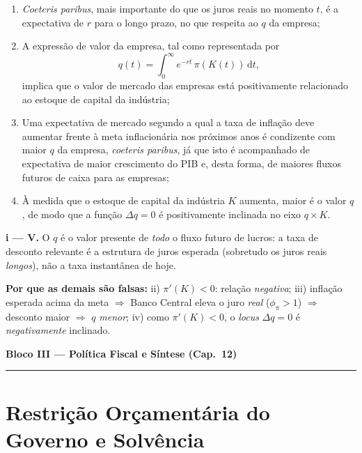 \documentclass[12pt, a4paper]{article}
\newcommand{\dif}{\mathrm{d}}
\begin{document}
\begin{enumerate}[label=\roman*)]
\item \emph{Coeteris paribus}, mais importante do que os juros reais no
momento $t$, é a expectativa de $r$ para o longo prazo, no que respeita ao $q$
da empresa;
\item A expressão de valor da empresa, tal como representada por
\[
q(t) = \int_{0}^{\infty} e^{-rt}\,\pi(K(t))\,\dif t,
\]
implica que o valor de mercado das empresas está positivamente relacionado ao
estoque de capital da indústria;
\item Uma expectativa de mercado segundo a qual a taxa de inflação deve
aumentar frente à meta inflacionária nos próximos anos é condizente com maior
$q$ da empresa, \emph{coeteris paribus}, já que isto é acompanhado de
expectativa de maior crescimento do PIB e, desta forma, de maiores fluxos
futuros de caixa para as empresas;
\item À medida que o estoque de capital da indústria $K$ aumenta, maior é o
valor $q$, de modo que a função $\Delta q = 0$ é positivamente inclinada no
eixo $q \times K$.
\end{enumerate}

\begin{correctbox}[title={Resposta: i) --- reciclada: gabarito oficial da P2 2024 (Q4-iii)}]
\textbf{i --- V.} O $q$ é o valor presente de \emph{todo} o fluxo futuro de
lucros: a taxa de desconto relevante é a estrutura de juros esperada
(sobretudo os juros reais \emph{longos}), não a taxa instantânea de hoje.

\textbf{Por que as demais são falsas:} ii) $\pi'(K) < 0$: relação
\emph{negativa}; iii) inflação esperada acima da meta $\Rightarrow$ Banco
Central eleva o juro \emph{real} ($\phi_\pi > 1$) $\Rightarrow$ desconto maior
$\Rightarrow$ $q$ \emph{menor}; iv) como $\pi'(K)<0$, o \emph{locus}
$\Delta q = 0$ é \emph{negativamente} inclinado.
\end{correctbox}

\begin{center}
{\large\bfseries\color{cyanrbc} Bloco III --- Política Fiscal e Síntese (Cap.\ 12)}\\[0.2em]
\rule{\linewidth}{0.6pt}
\end{center}

\section{Restrição Orçamentária do Governo e Solvência}
\end{document}

